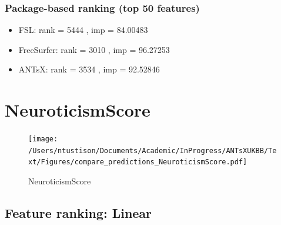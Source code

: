 \documentclass[
  10pt,
]{article}
\begin{document}
\hypertarget{package-based-ranking-top-50-features-1}{%
\subsubsection{Package-based ranking (top 50
features)}\label{package-based-ranking-top-50-features-1}}

\begin{itemize}
\item
  FSL: rank = 5444 , imp = 84.00483
\item
  FreeSurfer: rank = 3010 , imp = 96.27253
\item
  ANTsX: rank = 3534 , imp = 92.52846
\end{itemize}

\clearpage

\hypertarget{neuroticismscore}{%
\section{NeuroticismScore}\label{neuroticismscore}}

\begin{figure}
\centering
\texttt{[image: /Users/ntustison/Documents/Academic/InProgress/ANTsXUKBB/Text/Figures/compare\_predictions\_NeuroticismScore.pdf]}
\caption{NeuroticismScore}
\end{figure}

\hypertarget{feature-ranking-linear-2}{%
\subsection{Feature ranking: Linear}\label{feature-ranking-linear-2}}
\end{document}
